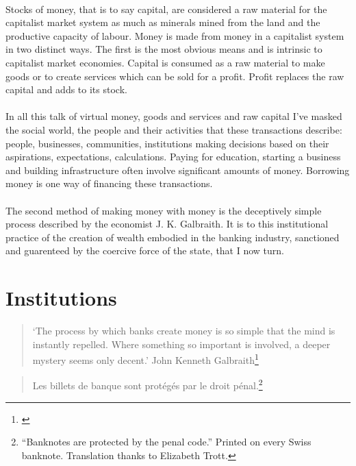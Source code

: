 \documentclass[12pt,a4paper,titlepage]{article}
\begin{document}
\paragraph{}Stocks of money, that is to say capital, are considered a raw material for the capitalist market system as much as minerals mined from the land and the productive capacity of labour. Money is made from money in a capitalist system in two distinct ways. The first is the most obvious means and is intrinsic to capitalist market economies. Capital is consumed as a raw material to make goods or to create services which can be sold for a profit. Profit replaces the raw capital and adds to its stock.

\paragraph{}In all this talk of virtual money, goods and services and raw capital I've masked the social world, the people and their activities that these transactions describe: people, businesses, communities, institutions making decisions based on their aspirations, expectations, calculations. Paying for education, starting a business and building infrastructure often involve significant amounts of money. Borrowing money is one way of financing these transactions.

\paragraph{}The second method of making money with money is the deceptively simple process described by the economist J. K. Galbraith. It is to this institutional practice of the creation of wealth embodied in the banking industry, sanctioned and guarenteed by the coercive force of the state, that I now turn.

\newpage
\section{Institutions}
\singlespacing
\begin{quote}
`The process by which banks create money is so simple that the mind is instantly repelled. Where something so important is involved, a deeper mystery seems only decent.' John Kenneth Galbraith\footnote{\cite[p. 29]{Galbraith:1975kx}}
\end{quote}
\medskip
\begin{quote}
Les billets de banque sont prot\'{e}g\'{e}s par le droit p\'{e}nal.\footnote{``Banknotes are protected by the penal code.'' Printed on every Swiss banknote. Translation thanks to Elizabeth Trott.}
\end{quote}
\end{document}

